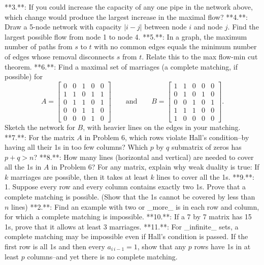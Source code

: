 

**3.**: If you could increase the capacity of any one pipe in the network above, which change would produce the largest increase in the maximal flow?
**4.**: Draw a 5-node network with capacity \(|i-j|\) between node \(i\) and node \(j\). Find the largest possible flow from node 1 to node 4.
**5.**: In a graph, the maximum number of paths from \(s\) to \(t\) with no common edges equals the minimum number of edges whose removal disconnects \(s\) from \(t\). Relate this to the max flow-min cut theorem.
**6.**: Find a maximal set of marriages (a complete matching, if possible) for \[A=\begin{bmatrix}0&0&1&0&0\\ 1&1&0&1&1\\ 0&1&1&0&1\\ 0&0&1&1&0\\ 0&0&0&1&0\end{bmatrix}\qquad\text{and}\qquad B=\begin{bmatrix}1&1&0&0&0\\ 0&1&0&1&0\\ 0&0&1&0&1\\ 1&1&1&0&0\\ 1&0&0&0&0\end{bmatrix}.\] Sketch the network for \(B\), with heavier lines on the edges in your matching.
**7.**: For the matrix \(A\) in Problem 6, which rows violate Hall's condition--by having all their 1s in too few columns? Which \(p\) by \(q\) submatrix of zeros has \(p+q>n\)?
**8.**: How many lines (horizontal and vertical) are needed to cover all the 1s in \(A\) in Problem 6? For any matrix, explain why weak duality is true: If \(k\) marriages are possible, then it takes at least \(k\) lines to cover all the 1s.
**9.**: 1. Suppose every row and every column contains exactly two 1s. Prove that a complete matching is possible. (Show that the 1s cannot be covered by less than \(n\) lines)
**2.**: Find an example with two or _more_ is in each row and column, for which a complete matching is impossible.
**10.**: If a 7 by 7 matrix has 15 1s, prove that it allows at least 3 marriages.
**11.**: For _infinite_ sets, a complete matching may be impossible even if Hall's condition is passed. If the first row is all 1s and then every \(a_{i\,i-1}=1\), show that any \(p\) rows have 1s in at least \(p\) columns--and yet there is no complete matching.

